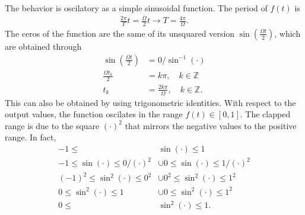 \documentclass[letterpaper,11pt,twoside]{article}
\begin{document}
The behavior is oscilatory as a simple sinusoidal function. The period of $f(t)$ is  
\begin{align*}
  \frac{2\pi}{T}t=\frac{\Omega}{2}t\longrightarrow T=\frac{4\pi}{\Omega}.
\end{align*}
The ceros of the function are the same of its unsquared version $\sin(\frac{\Omega t}{2})$, which are obtained through
\begin{align*}
  \sin\left(\frac{\Omega t}{2}\right)&=0/\sin^{-1}(\cdot)\\
  \frac{\Omega t_k}{2}&=k\pi,\quad k\in\mathbb{Z}\\
  t_k&=\frac{2k\pi}{\Omega},\quad k\in\mathbb{Z}.
\end{align*} 
This can also be obtained by using trigonometric identities.
With respect to the output values, the function oscilates in the range $f(t)\in[0,1]$. The clapped
range is due to the square $(\cdot)^2$ that mirrors the negative values to the positive range.
In fact, 
\begin{align*}
  -1\leq&\sin(\cdot)\leq1\\
  -1\leq\sin(\cdot)\leq0\bigr/(\cdot)^2&\cup0\leq\sin(\cdot)\leq1\bigr/(\cdot)^2\\
  (-1)^2\leq\sin^2(\cdot)\leq0^2&\cup0^2\leq\sin^2(\cdot)\leq1^2\\
  0\leq\sin^2(\cdot)\leq1&\cup0\leq\sin^2(\cdot)\leq1^2\\
  0\leq&\sin^2(\cdot)\leq1.
\end{align*}
\end{document}
